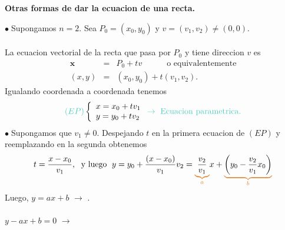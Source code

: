 \documentclass{article}
\theoremstyle{definition}
\theoremstyle{definition}
\theoremstyle{remark}
\newcommand\bl{$\bullet\;$}
\begin{document}
\begin{center}
\textbf{Otras formas de dar la ecuacion de una recta.}
\end{center}
\bl Supongamos $n=2$. Sea $P_0 = (x_0,y_0)$ y $v=(v_1,v_2) \neq (0,0)$. \\\\ La ecuacion vectorial de la recta que pasa por $P_0$ y tiene direccion $v$ es \[ \begin{array}{rcl}
  \mathbf{x}& = & P_0+tv \quad \quad \quad \text{o equivalentemente} \\ 
  (x,y) & = & (x_0,y_0) + t(v_1,v_2).
\end{array}
\] 
Igualando coordenada a coordenada tenemos \[ 
  \textcolor{verdep2}{(EP)} \left\{\begin{array}{l}
x = x_0+tv_1 \\
y=y_0+tv_2
\end{array}\right. \textcolor{verdep2}{\to \text{ Ecuacion parametrica.}}
\] 
\bl Supongamos que $v_1 \neq 0$. Despejando $t$ en la primera ecuacion de $(EP)$ y reemplazando en la segunda obtenemos \[
t=\frac{x-x_0}{v_1},\;  \text{ y luego }\; y = y_0 + \frac{(x-x_0)}{v_1} v_2 = \textcolor{rojop2}{\underbrace{\textcolor{black}{\frac{v_2}{v_1}}}_{a}} x + \textcolor{rojop2}{\underbrace{\textcolor{black}{\left (y_0 - \frac{v_2}{v_1} x_0 \right )}}_{b}}
\]
Luego, $y=ax+b$ \textcolor{verdep2}{$\to$ }. \\\\ \phantom{Luego,} $y-ax+b=0$ \textcolor{verdep2}{$\to$ }
\end{document}
